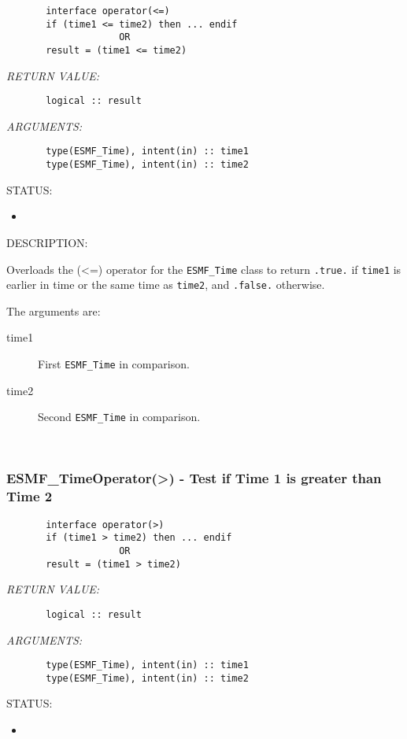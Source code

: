   
\begin{verbatim}       interface operator(<=)
       if (time1 <= time2) then ... endif
                    OR
       result = (time1 <= time2)\end{verbatim}{\em RETURN VALUE:}
\begin{verbatim}       logical :: result\end{verbatim}{\em ARGUMENTS:}
\begin{verbatim}       type(ESMF_Time), intent(in) :: time1
       type(ESMF_Time), intent(in) :: time2\end{verbatim}
{\sf STATUS:}
   \begin{itemize}
   \item{}
   \end{itemize}
  
{\sf DESCRIPTION:\\ }


       Overloads the (<=) operator for the {\tt ESMF\_Time} class to return 
       {\tt .true.} if {\tt time1} is earlier in time or the same time as 
       {\tt time2}, and {\tt .false.} otherwise.
  
       The arguments are:
       \begin{description}
       \item[time1]
            First {\tt ESMF\_Time} in comparison.
       \item[time2]
            Second {\tt ESMF\_Time} in comparison.
       \end{description}
   
 
\mbox{}\hrulefill\ 
 
\subsubsection [ESMF\_TimeOperator(>)] {ESMF\_TimeOperator(>) - Test if Time 1 is greater than Time 2}


  
\begin{verbatim}       interface operator(>)
       if (time1 > time2) then ... endif
                    OR
       result = (time1 > time2)\end{verbatim}{\em RETURN VALUE:}
\begin{verbatim}       logical :: result\end{verbatim}{\em ARGUMENTS:}
\begin{verbatim}       type(ESMF_Time), intent(in) :: time1
       type(ESMF_Time), intent(in) :: time2\end{verbatim}
{\sf STATUS:}
   \begin{itemize}
   \item{}
   \end{itemize}
  
